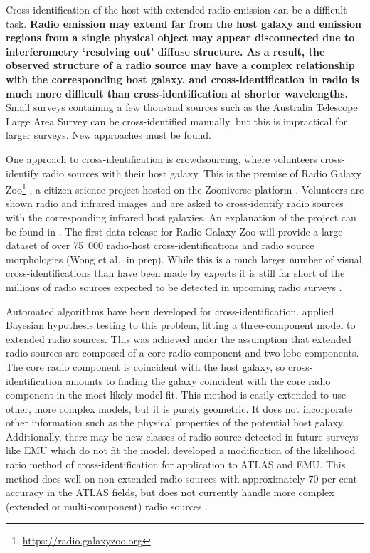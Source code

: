 \documentclass[fleqn,usenatbib,usedcolumn]{mnras}
\newcommand{\edited}[1]{{\bf {#1}}}
\begin{document}
  Cross-identification of the host with extended radio emission can be a
  difficult task. \edited{Radio emission may extend far from the host galaxy
  and emission regions from a single physical object may appear disconnected
  due to interferometry `resolving out' diffuse structure. As a result, the
  observed structure of a radio source may have a complex relationship
  with the corresponding host galaxy, and cross-identification in radio is
  much more difficult than cross-identification at shorter wavelengths.} Small surveys
  containing a few thousand sources such as the Australia Telescope Large Area Survey
  \citep[ATLAS;][]{norris06, middelberg08} can be cross-identified manually,
  but this is impractical for larger surveys. New approaches must be found.

  One approach to cross-identification is crowdsourcing, where volunteers
  cross-identify radio sources with their host galaxy. This is the premise of Radio Galaxy
  Zoo\footnote{\url{https://radio.galaxyzoo.org}} \citep{banfield15}, a
  citizen science project hosted on the Zooniverse platform \citep{lintott08}.
  Volunteers are shown radio and infrared images and are asked to
  cross-identify radio sources with the corresponding infrared host galaxies. An
  explanation of the project can be found in \citet{banfield15}. The first
  data release for Radio Galaxy Zoo will provide a large dataset of over
  75~000 radio-host cross-identifications and radio source morphologies
  (Wong et al., in prep). While this is a much larger number of visual
  cross-identifications than have been made by experts \citep[e.g.,
  ][]{Taylor2007,Gendre2008,Grant2010,norris06,middelberg08} it is still far
  short of the millions of radio sources expected to be detected in upcoming
  radio surveys \citep{norris17surveys}.

  Automated algorithms have been developed for cross-identification.
  \citet{fan15} applied Bayesian
  hypothesis testing to this problem, fitting a three-component model to extended radio
  sources. This was achieved under the assumption that extended radio sources
  are composed of a core radio component and two lobe components. The core
  radio component is coincident with the host galaxy, so cross-identification
  amounts to finding the galaxy coincident with the core radio component in
  the most likely model fit. This method is easily extended to use other, more
  complex models, but it is purely geometric. It does not incorporate
  other information such as the physical properties of the potential host
  galaxy. Additionally, there may be new classes of radio source detected in
  future surveys like EMU which do not fit the model. \citet{weston18lrpy}
  developed a modification of the likelihood ratio method of
  cross-identification \citep{richter75likelihood} for application to ATLAS
  and EMU. This method does well on non-extended radio sources
  with approximately 70 per cent accuracy in the ATLAS fields, but does
  not currently handle more complex (extended or multi-component) radio sources
  \citep{norris17unexpected}.
\end{document}

